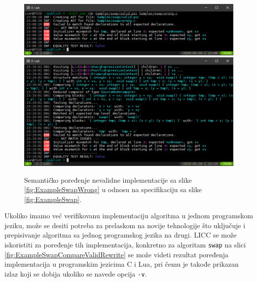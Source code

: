 \begin{figure}[h!]
\centering
\includegraphics[scale=0.65]{images/eval/cmp_wrong.png}
\includegraphics[scale=0.65]{images/eval/cmp_wrong_v.png}
\caption{Semantičko poređenje nevalidne implementacije sa slike \ref{fig:ExampleSwapWrong} u odnosu na specifikaciju sa slike \ref{fig:ExampleSwap}.}
\label{fig:ExampleSwapCompareWrong}
\end{figure}

Ukoliko imamo već verifikovanu implementaciju algoritma u jednom programskom jeziku, može se desiti potreba za prelaskom na novije tehnologije što uključuje i prepisivanje algoritma sa jednog programskog jezika na drugi. LICC se može iskoristiti za poređenje tih implementacija, konkretno za algoritam \texttt{swap} na slici \ref{fig:ExampleSwapCompareValidRewrite} se može videti rezultat poređenja implementacija u programskim jezicima C i Lua, pri čemu je takođe prikazan izlaz koji se dobija ukoliko se navede opcija \texttt{-v}. 

